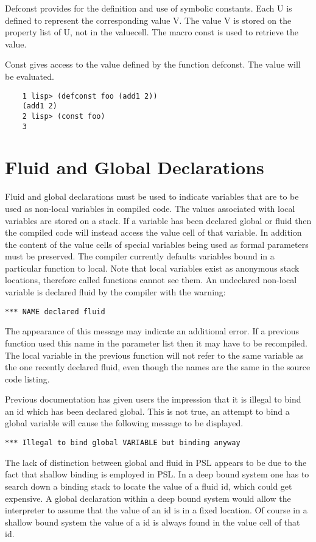 {    Defconst  provides  for  the  definition and use of symbolic
    constants.  Each U is defined to represent the corresponding
    value V.  The value V is stored on the property list  of  U,
    not  in  the valuecell.  The macro const is used to retrieve
    the value.
}

{    Const gives access to the  value  defined  by  the  function
    defconst.  The value will be evaluated.
}
\begin{verbatim}
    1 lisp> (defconst foo (add1 2))
    (add1 2)
    2 lisp> (const foo)
    3
\end{verbatim}
\section{Fluid and Global Declarations}

  Fluid  and  global  declarations  must  be  used  to  indicate
variables that are to be used as non-local variables in compiled
code. The values associated with local variables are stored on a
stack. If a variable has been declared global or fluid then  the
compiled  code  will  instead  access  the  value  cell  of that
variable. In addition the content of the value cells of  special
variables  being  used  as  formal parameters must be preserved.
The compiler currently defaults variables bound in a  particular
function  to local. Note that local variables exist as anonymous
stack locations, therefore called functions cannot see them.  An
undeclared  non-local variable is declared fluid by the compiler
with the warning:

\begin{verbatim}
*** NAME declared fluid
\end{verbatim}
The appearance of this message may indicate an additional error.
If a previous function used this name in the parameter list then
it may have  to  be  recompiled.   The  local  variable  in  the
previous function will not refer to the same variable as the one
recently  declared  fluid, even though the names are the same in
the source code listing.

  Previous documentation has given users the impression that  it
is  illegal  to bind an id which has been declared global.  This
is not true, an attempt to bind a global variable will cause the
following message to be displayed.

\begin{verbatim}
*** Illegal to bind global VARIABLE but binding anyway
\end{verbatim}
The lack of distinction between global and fluid in PSL  appears
to  be  due to the fact that shallow binding is employed in PSL.
In a deep bound system one has to search down a binding stack to
locate the value of a fluid id, which  could  get  expensive.  A
global  declaration  within  a deep bound system would allow the
interpreter to assume that the value of an  id  is  in  a  fixed
location.  Of course in a shallow bound system the value of a id
is always found in the value cell of that id.

